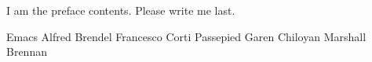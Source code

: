 \documentclass[%
  class = article,%
  crop = false,%
  float = true,%
  multi = true,%
  preview = false,%
]{standalone}
\begin{document}
I am the preface contents. Please write me last.

Emacs
Alfred Brendel
Francesco Corti
Passepied
Garen Chiloyan
Marshall Brennan
\end{document}
